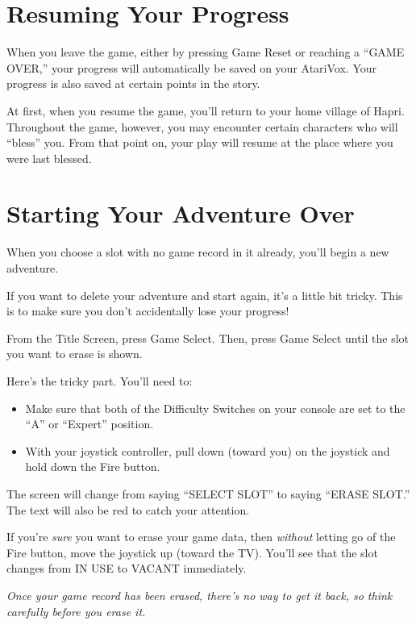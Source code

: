 \documentclass[10pt,twoside,openright]{memoir}
\begin{document}
\section{Resuming Your Progress}

When you leave the game, either by pressing Game Reset or reaching a
``GAME OVER,'' your progress will automatically be saved on your
AtariVox. Your progress is also saved at certain points in the story.

At first, when you resume the game, you'll return to your home village
of Hapri. Throughout the game, however, you may encounter certain
characters who will ``bless'' you. From that point on, your play will
resume at the place where you were last blessed.

\section{Starting Your Adventure Over}\label{Starting Your Adventure Over}

When you choose a slot with no game record in it already, you'll begin
a new adventure.

If you want to delete your adventure  and start again, it's a little bit
tricky. This is to make sure you don't accidentally lose your progress!

From the Title Screen, press Game  Select. Then, press Game Select until
the slot you want to erase is shown.

Here's the tricky part. You'll need to:

\begin{itemize}
\item Make sure that both of the Difficulty Switches on your console
  are set to the ``A'' or ``Expert'' position.
\item With your joystick controller, pull down (toward you) on the
  joystick and hold down the Fire button.
\end{itemize}

The screen will change from saying ``SELECT SLOT'' to saying ``ERASE
SLOT.'' The text will also be red to catch your attention.

If  you're  \emph{sure}   you  want  to  erase  your   game  data,  then
\emph{without}  letting go  of the  Fire  button, move  the joystick  up
(toward  the TV).  You'll  see that  the  slot changes  from  IN USE  to
VACANT immediately.

\emph{Once your  game record has been  erased, there's no way  to get it
  back, so think carefully before you erase it.}
\end{document}
